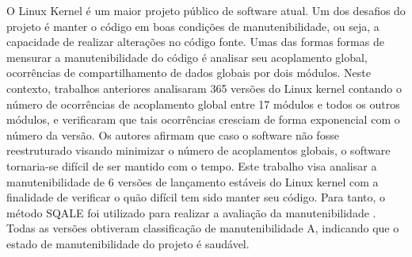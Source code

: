 O Linux Kernel é um maior projeto público de software atual. Um dos desafios do projeto é manter o código em boas condições de manutenibilidade, ou seja, a capacidade de realizar alterações no código fonte. Umas das formas formas de mensurar a manutenibilidade do código é analisar seu acoplamento global, ocorrências de compartilhamento de dados globais por dois módulos. Neste contexto, trabalhos anteriores analisaram 365 versões do Linux kernel contando o número de ocorrências de acoplamento global entre 17 módulos e todos os outros módulos, e verificaram que tais ocorrências cresciam de forma exponencial com o número da versão. Os autores afirmam que caso o software não fosse reestruturado visando minimizar o número de acoplamentos globais, o software tornaria-se difícil de ser mantido com o tempo. Este trabalho visa analisar a manutenibilidade de 6 versões de lançamento estáveis do Linux kernel com a finalidade de verificar o quão difícil tem sido manter seu código. Para tanto, o método SQALE foi utilizado para realizar a avaliação da manutenibilidade . Todas as versões obtiveram classificação de manutenibilidade A, indicando que o estado de manutenibilidade do projeto é saudável.
